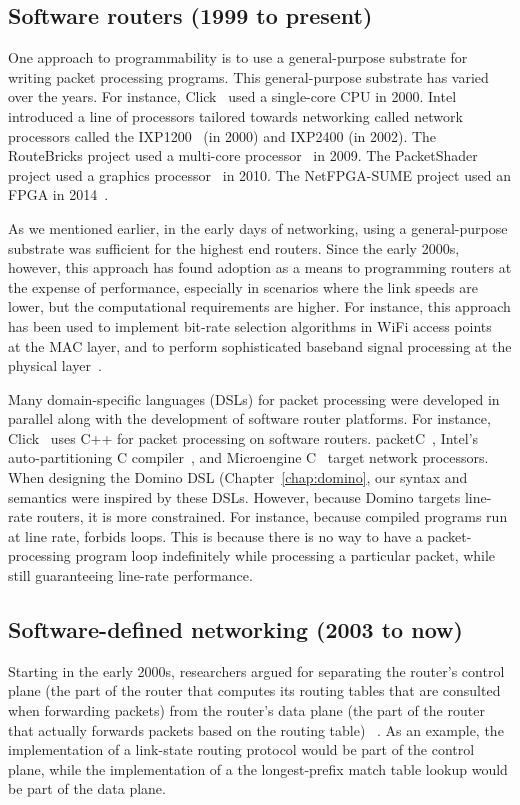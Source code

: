 
\subsection{Software routers (1999 to present)}
One approach to programmability is to use a general-purpose substrate for
writing packet processing programs. This general-purpose substrate has varied
over the years. For instance, Click~\cite{click} used a single-core CPU in
2000.  Intel introduced a line of processors tailored towards networking called
network processors called the IXP1200~\cite{ixp2400} (in 2000) and IXP2400 (in
2002).  The RouteBricks project used a multi-core processor~\cite{routebricks}
in 2009. The PacketShader project used a graphics processor~\cite{packetshader}
in 2010. The NetFPGA-SUME project used an FPGA in 2014~\cite{netfgpa}.

As we mentioned earlier, in the early days of networking, using a
general-purpose substrate was sufficient for the highest end routers. Since the
early 2000s, however, this approach has found adoption as a means to
programming routers at the expense of performance, especially in scenarios
where the link speeds are lower, but the computational requirements are higher.
For instance, this approach has been used to implement bit-rate selection
algorithms in WiFi access points~\cite{samplerate, roofnet} at the MAC layer,
and to perform sophisticated baseband signal processing at the physical
layer~\cite{sdr, mota_bell_labs}.

Many domain-specific languages (DSLs) for packet processing were developed in
parallel along with the development of software router platforms. For instance,
Click~\cite{click} uses C++ for packet processing on software routers.
packetC~\cite{packetc}, Intel's auto-partitioning C
compiler~\cite{intel_uiuc_pldi}, and Microengine C~\cite{microenginec} target
network processors. When designing the Domino DSL (Chapter~\ref{chap:domino},
our syntax and semantics were inspired by these DSLs.  However, because Domino
targets line-rate routers, it is more constrained. For instance, because
compiled programs run at line rate, \pktlanguage forbids loops. This is because
there is no way to have a packet-processing program loop indefinitely while
processing a particular packet, while still guaranteeing line-rate performance.

\subsection{Software-defined networking (2003 to now)}
Starting in the early 2000s, researchers argued for separating the router's
control plane (\ie the part of the router that computes its routing tables that
are consulted when forwarding packets) from the router's data plane (\ie the
part of the router that actually forwards packets based on the routing table)
~\cite{rcp, forces, fourd, ethane, sane}. As an example, the implementation of
a link-state routing protocol would be part of the control plane, while the
implementation of a the longest-prefix match table lookup would be part of the
data plane.

